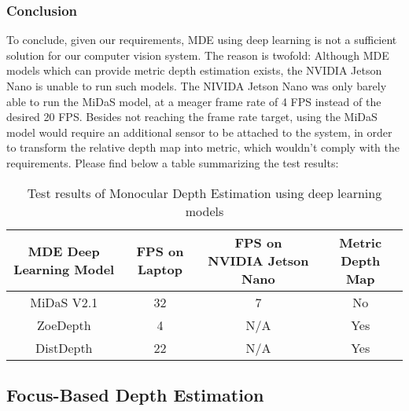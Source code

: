 \documentclass{article}[a4paper]
\begin{document}
\subsubsection{Conclusion}
To conclude, given our requirements, MDE using deep learning is not a sufficient solution for our computer vision system. The reason is twofold:
Although MDE models which can provide metric depth estimation exists, the NVIDIA Jetson Nano is unable to run such models. The NIVIDA Jetson Nano was only barely able to run the MiDaS model, at a meager frame rate of 4 FPS instead of the desired 20 FPS. Besides not reaching the frame rate target, using the MiDaS model would require an additional sensor to be attached to the system, in order to transform the relative depth map into metric, which wouldn't comply with the requirements. 
Please find below a table summarizing the test results:

\begin{center}
    \begin{table}[H]
    \centering
    \begin{tabular}{|c|c|c|c|} 
        \hline
        \textbf{MDE Deep Learning Model} & \textbf{FPS on Laptop} & \textbf{FPS on NVIDIA Jetson Nano} & \textbf{Metric Depth Map}  \\ 
        \hline
        MiDaS V2.1                                             & 32                                          & 7                                                       & No                                              \\ 
        ZoeDepth                                               & 4                                           & N/A                                                     & Yes                                             \\ 
        DistDepth                                              & 22                                          & N/A                                                     & Yes                                             \\
        \hline
    \end{tabular}
    \caption{Test results of Monocular Depth Estimation using deep learning models}
    \end{table}
\end{center}

\newpage
\subsection{Focus-Based Depth Estimation}
\end{document}
